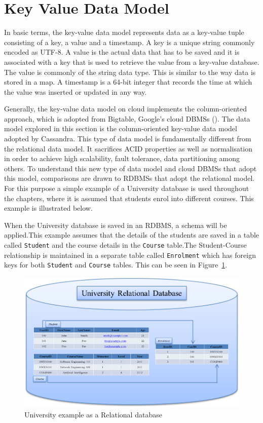 \section{Key Value Data Model}\label{s:key-value-data-model}
In basic terms, the key-value data model represents data as a key-value tuple
consisting of a key, a value and a timestamp. A key is a unique string commonly
encoded as UTF-8. A value is the actual data that has to be saved and it is
associated with a key that is used to retrieve the value from a key-value
database. The value is commonly of the string data type.
This is similar to the way data is stored in a map. A timestamp is a 64-bit
integer that records the time at which the value was inserted or updated in
any way.

Generally, the key-value data model on cloud implements the column-oriented
approach, which is adopted from Bigtable, Google's cloud \acp{DBMS} (). The data model explored in this section is the column-oriented key-value
data model adopted by Cassandra. This type of data model is fundamentally
different from the relational data model. It sacrifices ACID properties as well
as normalisation in order to achieve high scalability, fault tolerance, data
partitioning among others. To understand this new type of data model and cloud
\acp{DBMS} that adopt this model, comparisons are drawn to \acp{RDBMS} that
adopt the relational model. For this purpose a simple
example of a University database is used throughout the chapters, where it
is assumed that students enrol into different courses. This example is
illustrated below.

When the University database is saved in an \ac{RDBMS}, a schema will be
applied.This example assumes that the details of the students are saved in a
table called \texttt{Student} and the course details in the \texttt{Course}
table.The Student-Course relationship is maintained in a separate table called
\texttt{Enrolment} which has foreign keys for both \texttt{Student} and
\texttt{Course} tables. This can be seen in Figure~\ref{f:RDB}.


\begin{figure}[h]
	\centering
	\includegraphics[width=.7\textwidth]{./figure/Example/Relational-DB.png}
	\caption{University example as a Relational database}\label{f:RDB}
\end{figure}

